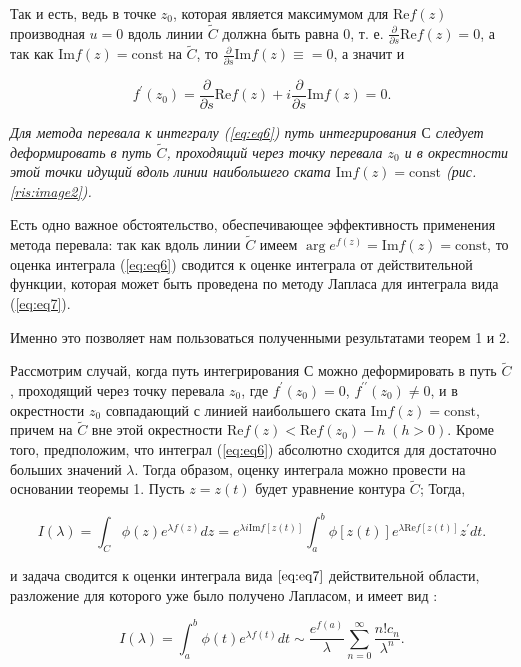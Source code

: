 \documentclass[14pt]{article}
\numberwithin{figure}{section}
\numberwithin{equation}{section}
\renewcommand{\Re}{\mathrm{Re}}
\renewcommand{\Im}{\mathrm{Im}}
\newcommand{\const}{\mathrm{const}}
\begin{document}
Так и есть, ведь в точке $z_0$, которая является максимумом для $\Re f (z)$ производная $u=0$ вдоль линии $\widetilde{C}$ должна быть равна 0, т. е. $\frac{\partial}{\partial s}\Re f(z)=0$, а так как $\Im f(z) = \const$ на $\widetilde{C}$, то $\frac{\partial}{\partial s} \Im f(z) \equiv = 0$, а значит и 

$$
f^\prime(z_0) = \frac{\partial}{\partial s} \Re f(z) + i\frac{\partial}{\partial s} \Im f(z) = 0.
$$ 

\textit{Для метода перевала к интегралу (\ref{eq:eq6}) путь интегрирования $С$ следует деформировать в путь $\widetilde{C}$, проходящий через точку перевала $z_0$ и в окрестности этой точки идущий вдоль линии наибольшего ската $\Im f(z) = \const$ (рис. \ref{ris:image2}).}

Есть одно важное обстоятельство, обеспечивающее эффективность применения метода перевала: так как вдоль линии $\widetilde{C}$ имеем $\arg e^{f(z)} = \Im f(z) = \const$, то оценка интеграла (\ref{eq:eq6}) сводится к оценке интеграла от действительной функции, которая может быть проведена по методу Лапласа для интеграла вида (\ref{eq:eq7}).  \cite{Fedoryuk}

Именно это позволяет нам пользоваться полученными результатами теорем 1 и 2. 

Рассмотрим  случай, когда путь интегрирования $С$ можно деформировать в путь $\widetilde{C}$, проходящий через точку перевала $z_0$, где $f^\prime(z_0) = 0$, $f^{\prime\prime}(z_0)\neq0$, и в окрестности $z_0$ совпадающий с линией наибольшего ската $\Im f(z) = \const$, причем на $\widetilde{C}$ вне этой окрестности $\Re f(z) < \Re f(z_0) - h \;(h> 0)$. Кроме того, предположим, что интеграл (\ref{eq:eq6}) абсолютно сходится для достаточно больших значений $\lambda$.
Тогда образом, оценку интеграла можно провести на основании теоремы 1. Пусть $z = z(t)$ будет уравнение контура $\widetilde{C}$; Тогда,

\begin{equation}\label{eq:eq11}
I(\lambda) = \int_{C}^{}\phi(z) e^{\lambda f(z)}dz=e^{\lambda i \Im f[z(t)]}\int_{a}^{b}\phi[z(t)]e^{\lambda \Re f[z(t)]}z^{\prime} dt.
\end{equation}

и задача сводится к оценки интеграла вида $\ref{eq:eq7}$ действительной области, разложение для которого уже было получено Лапласом, и имеет вид \cite{Wong}:

$$
I(\lambda) = \int_{a}^{b}\phi(t)e^{\lambda f(t)}dt \sim \frac{e^{f(a)}}{\lambda}\sum_{n=0}^{\infty}\frac{n! c_n}{\lambda^n}.
$$
\end{document}
